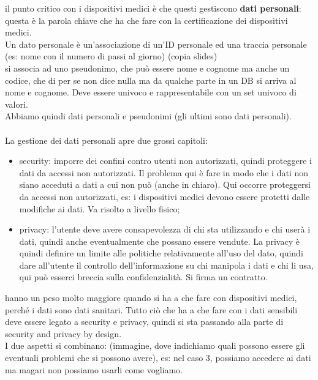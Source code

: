\documentclass[oneside, 12pt]{extbook}
\begin{document}
il punto critico con i dispositivi medici è che questi gestiscono \textbf{dati personali}: questa è la parola chiave che ha che fare con la certificazione dei dispositivi medici.\\Un dato personale è un'associazione di un'ID personale ed una traccia personale (es: nome con il numero di passi al giorno) (copia slides)\\si associa ad uno pseudonimo, che può essere nome e cognome ma anche un codice, che di per se non dice nulla ma da qualche parte in un DB si arriva al nome e cognome. Deve essere univoco e rappresentabile con un set univoco di valori.\\Abbiamo quindi dati personali e pseudonimi (gli ultimi sono dati personali).\\\\La gestione dei dati personali apre due grossi capitoli:
\begin{itemize}
	\item security: imporre dei confini contro utenti non autorizzati, quindi proteggere i dati da accessi non autorizzati. Il problema qui è fare in modo che i dati non siano acceduti a dati a cui non può (anche in chiaro). Qui occorre proteggersi da accessi non autorizzati, es: i dispositivi medici devono essere protetti dalle modifiche ai dati. Va risolto a livello fisico;
	\item privacy: l'utente deve avere consapevolezza di chi sta utilizzando e chi userà i dati, quindi anche eventualmente che possano essere vendute. La privacy è quindi definire un limite alle politiche relativamente all'uso del dato, quindi dare all'utente il controllo dell'informazione su chi manipola i dati e chi li usa, qui può esserci breccia sulla confidenzialità. Si firma un contratto.
\end{itemize}
hanno un peso molto maggiore quando si ha a che fare con dispositivi medici, perché i dati sono dati sanitari. Tutto ciò che ha a che fare con i dati sensibili deve essere legato a security e privacy, quindi si sta passando alla parte di security and privacy by design.\\I due aspetti si combinano: (immagine, dove indichiamo quali possono essere gli eventuali problemi che si possono avere), es: nel caso 3, possiamo accedere ai dati ma magari non possiamo usarli come vogliamo.
\end{document}
